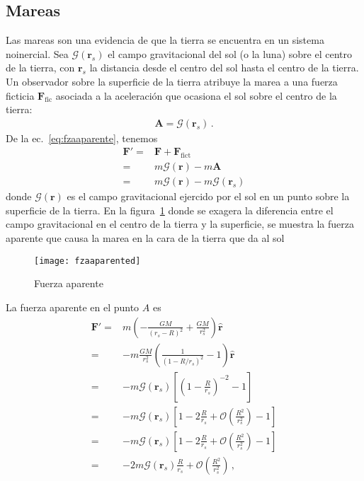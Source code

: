 \subsection{Mareas}
Las mareas son una evidencia de que la tierra se encuentra en un
sistema noinercial. Sea $\boldsymbol{\mathcal{G}}(\mathbf{r}_{s})$ el
campo gravitacional del sol (o la luna) sobre el centro de la tierra,
con $\mathbf{r}_{s}$ la distancia desde el centro del sol hasta el
centro de la tierra. Un observador sobre la superficie de la tierra
atribuye la marea a una fuerza ficticia $\mathbf{F}_{\text{fic}}$
asociada a la aceleración que ocasiona el sol sobre el centro de la
tierra:
\begin{align}
  \mathbf{A}=\mathcal{G}(\mathbf{r}_s)\,.
\end{align}
De la ec.~\eqref{eq:fzaaparente}, tenemos
\begin{align}
  \mathbf{F}'=&\mathbf{F}+\mathbf{F}_{\text{fict}}\nonumber\\
  =&m \boldsymbol{\mathcal{G}}(\mathbf{r})-m\mathbf{A}\nonumber\\
  =&m \boldsymbol{\mathcal{G}}(\mathbf{r})-m \boldsymbol{\mathcal{G}}(\mathbf{r}_s)
\end{align}
donde $\boldsymbol{\mathcal{G}}(\mathbf{r})$ es el campo gravitacional ejercido por el sol en un punto sobre la superficie de la tierra. En la figura~\ref{fig:fzaaparente} donde se exagera la diferencia entre el campo gravitacional en el centro de la tierra y la superficie, se muestra la fuerza aparente que causa la marea en la cara de la tierra que da al sol
\begin{frame}
\begin{figure}
  \centering
{\texttt{[image: fzaaparented]}}
  \caption{Fuerza aparente}
  \label{fig:fzaaparente}
\end{figure}
\end{frame}
La fuerza aparente en el punto $A$ es
\begin{align*}
  \mathbf{F}'=&m \left(-\frac{GM}{(r_s-R)^2}+\frac{GM}{r_s^2}  \right)\widehat{\mathbf{r}}\nonumber\\
   =&-m\frac{GM}{r_s^2}  \left(\frac{1}{(1-R/r_s)^2}-1  \right)\widehat{\mathbf{r}}\nonumber\\
   =&-m\boldsymbol{\mathcal{G}}(\mathbf{r}_s)\left[ \left( 1-\frac{R}{r_s} \right)^{-2}-1 \right]\nonumber\\
   =&-m\boldsymbol{\mathcal{G}}(\mathbf{r}_s)\left[ 1-2\frac{R}{r_s}+\mathcal{O}\left( \frac{R^2}{r_s^2} \right)-1 \right]\nonumber\\
   =&-m\boldsymbol{\mathcal{G}}(\mathbf{r}_s)\left[ 1-2\frac{R}{r_s}+\mathcal{O}\left( \frac{R^2}{r_s^2} \right)-1 \right]\nonumber\\
   =&-2m\boldsymbol{\mathcal{G}}(\mathbf{r}_s)\frac{R}{r_s}+\mathcal{O}\left( \frac{R^2}{r_s^2} \right)\,,
\end{align*}
